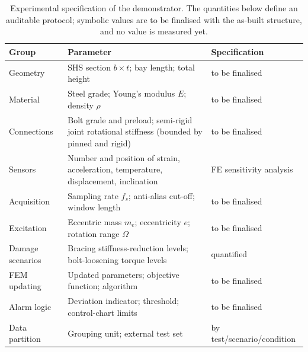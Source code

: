 \begin{table}[htbp]
\centering
\caption{Experimental specification of the demonstrator. The quantities below define an auditable protocol; symbolic values are to be finalised with the as-built structure, and no value is measured yet.}
\label{tab:params}
\begin{tabularx}{\linewidth}{@{}l X l@{}}
\toprule
\textbf{Group} & \textbf{Parameter} & \textbf{Specification} \\
\midrule
Geometry        & SHS section $b\times t$; bay length; total height                                   & to be finalised \\
Material         & Steel grade; Young's modulus $E$; density $\rho$                                    & to be finalised \\
Connections      & Bolt grade and preload; semi-rigid joint rotational stiffness (bounded by pinned and rigid) & to be finalised \\
Sensors          & Number and position of strain, acceleration, temperature, displacement, inclination & FE sensitivity analysis \\
Acquisition      & Sampling rate $f_s$; anti-alias cut-off; window length                              & to be finalised \\
Excitation       & Eccentric mass $m_e$; eccentricity $e$; rotation range $\Omega$                     & to be finalised \\
Damage scenarios & Bracing stiffness-reduction levels; bolt-loosening torque levels                    & quantified \\
FEM updating     & Updated parameters; objective function; algorithm                                   & to be finalised \\
Alarm logic      & Deviation indicator; threshold; control-chart limits                                & to be finalised \\
Data partition   & Grouping unit; external test set                                                    & by test/scenario/condition \\
\bottomrule
\end{tabularx}
\end{table}
